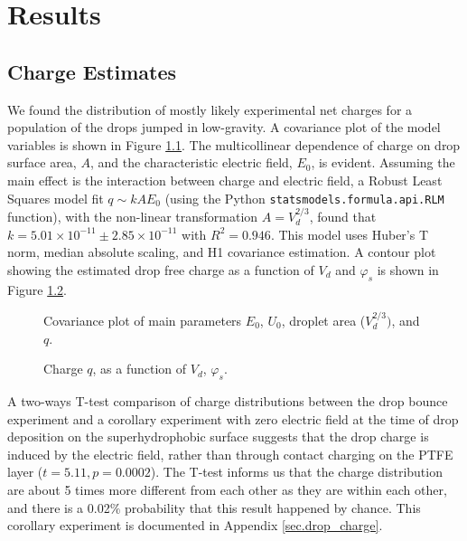 \documentclass[12pt,a4paper,oneside]{book}
\begin{document}
\chapter{Results}
\section{Charge Estimates}
We found the distribution of mostly likely experimental net charges for a population of the drops jumped in low-gravity. A covariance plot of the model variables is shown in Figure \ref{fig:scatter}. The multicollinear dependence of charge on drop surface area, $A$, and the characteristic electric field, $E_0$, is evident. Assuming the main effect is the interaction between charge and electric field, a Robust Least Squares model fit $q \sim kAE_0$ (using the Python \verb|statsmodels.formula.api.RLM| function), with the non-linear transformation $A = V_d^{2/3}$, found that $k=5.01 \times 10^{-11} \pm  2.85 \times 10^{-11}$ with $R^2 = 0.946$. This model uses Huber's T norm, median absolute scaling, and H1 covariance estimation. A contour plot showing the estimated drop free charge as a function of $V_d$ and $\varphi_s$ is shown in Figure \ref{fig:charge}.
\begin{figure}[htb]
    \centering
    \resizebox{12cm}{!}{}
    \caption{Covariance plot of main parameters $E_0$, $U_0$, droplet area ($V_d^{2/3})$, and $q$.\label{fig:scatter}}
\end{figure}
\begin{figure}[htb]
    \centering
    
    \caption{Charge $q$, as a function of $V_d$, $\varphi_s$.\label{fig:charge}}
\end{figure}

A two-ways T-test comparison of charge distributions between the drop bounce experiment and a corollary experiment with zero electric field at the time of drop deposition on the superhydrophobic surface suggests that the drop charge is induced by the electric field, rather than through contact charging on the PTFE layer ($t = 5.11, p = 0.0002$). The T-test informs us that the charge distribution  are about 5 times more different from each other as they are within each other, and there is a 0.02$\%$ probability that this result happened by chance. This corollary experiment is documented in Appendix \ref{sec.drop_charge}.
\end{document}
